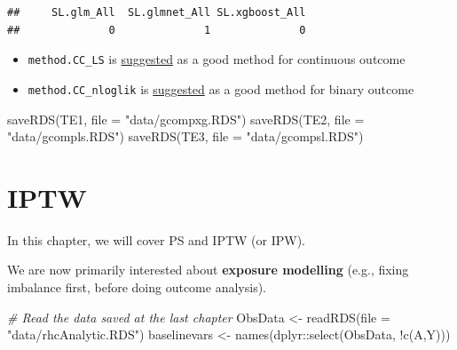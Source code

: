 \documentclass[
]{book}
\newenvironment{Shaded}{\begin{snugshade}}{\end{snugshade}}
\newcommand{\AttributeTok}[1]{\textcolor[rgb]{0.77,0.63,0.00}{#1}}
\newcommand{\CommentTok}[1]{\textcolor[rgb]{0.56,0.35,0.01}{\textit{#1}}}
\newcommand{\FunctionTok}[1]{\textcolor[rgb]{0.00,0.00,0.00}{#1}}
\newcommand{\NormalTok}[1]{#1}
\newcommand{\OtherTok}[1]{\textcolor[rgb]{0.56,0.35,0.01}{#1}}
\newcommand{\SpecialCharTok}[1]{\textcolor[rgb]{0.00,0.00,0.00}{#1}}
\newcommand{\StringTok}[1]{\textcolor[rgb]{0.31,0.60,0.02}{#1}}
\providecommand{\tightlist}{%
  \setlength{\itemsep}{0pt}\setlength{\parskip}{0pt}}
\begin{document}
\begin{Shaded}
\end{Shaded}

\begin{verbatim}
##     SL.glm_All  SL.glmnet_All SL.xgboost_All 
##              0              1              0
\end{verbatim}

\begin{itemize}
\tightlist
\item
  \texttt{method.CC\_LS} is \href{https://si.biostat.washington.edu/sites/default/files/modules/lab1_0.pdf}{suggested} as a good method for continuous outcome
\item
  \texttt{method.CC\_nloglik} is \href{https://si.biostat.washington.edu/sites/default/files/modules/lab1_0.pdf}{suggested} as a good method for binary outcome
\end{itemize}

\begin{Shaded}
\begin{Highlighting}[]
\FunctionTok{saveRDS}\NormalTok{(TE1, }\AttributeTok{file =} \StringTok{"data/gcompxg.RDS"}\NormalTok{)}
\FunctionTok{saveRDS}\NormalTok{(TE2, }\AttributeTok{file =} \StringTok{"data/gcompls.RDS"}\NormalTok{)}
\FunctionTok{saveRDS}\NormalTok{(TE3, }\AttributeTok{file =} \StringTok{"data/gcompsl.RDS"}\NormalTok{)}
\end{Highlighting}
\end{Shaded}

\hypertarget{iptw}{%
\chapter{IPTW}\label{iptw}}

In this chapter, we will cover PS and IPTW (or IPW).

\begin{rmdcomment}
We are now primarily interested about \textbf{exposure modelling} (e.g.,
fixing imbalance first, before doing outcome analysis).
\end{rmdcomment}

\begin{Shaded}
\begin{Highlighting}[]
\CommentTok{\# Read the data saved at the last chapter}
\NormalTok{ObsData }\OtherTok{\textless{}{-}} \FunctionTok{readRDS}\NormalTok{(}\AttributeTok{file =} \StringTok{"data/rhcAnalytic.RDS"}\NormalTok{)}
\NormalTok{baselinevars }\OtherTok{\textless{}{-}} \FunctionTok{names}\NormalTok{(dplyr}\SpecialCharTok{::}\FunctionTok{select}\NormalTok{(ObsData, }\SpecialCharTok{!}\FunctionTok{c}\NormalTok{(A,Y)))}
\end{Highlighting}
\end{Shaded}
\end{document}
